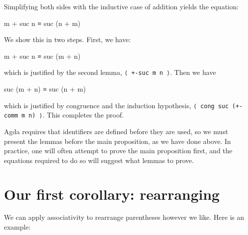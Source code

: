 Simplifying both sides with the inductive case of addition yields the
equation:

\begin{myDisplay}
m + suc n ≡ suc (n + m)
\end{myDisplay}

We show this in two steps. First, we have:

\begin{myDisplay}
m + suc n ≡ suc (m + n)
\end{myDisplay}

which is justified by the second lemma, \texttt{⟨\ +-suc\ m\ n\ ⟩}. Then
we have

\begin{myDisplay}
suc (m + n) ≡ suc (n + m)
\end{myDisplay}

which is justified by congruence and the induction hypothesis,
\texttt{⟨\ cong\ suc\ (+-comm\ m\ n)\ ⟩}. This completes the proof.

Agda requires that identifiers are defined before they are used, so we
must present the lemmas before the main proposition, as we have done
above. In practice, one will often attempt to prove the main proposition
first, and the equations required to do so will suggest what lemmas to
prove.

\hypertarget{Induction-sections}{%
\section{Our first corollary: rearranging}\label{Induction-sections}}

We can apply associativity to rearrange parentheses however we like.
Here is an example:


